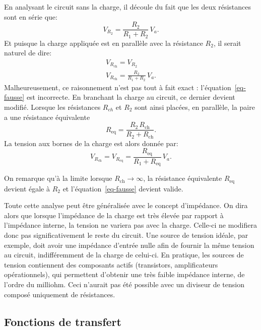 \documentclass[12pt,oneside,letterpaper]{article}
\begin{document}
En analysant le circuit sans la charge, il découle du fait que les deux résistances sont en série que:
\begin{equation}
V_{R_2}=\frac{R_2}{R_1+R_2}\,V_a.
\end{equation}
Et puisque la charge appliquée est en parallèle avec la résistance $R_2$, il serait naturel de dire:
\begin{gather}
V_{R_{\mathrm{ch}}}=V_{R_2}\\
\label{eq-fausse}
V_{R_{\mathrm{ch}}}=\frac{R_2}{R_1+R_2}\,V_a.
\end{gather}
Malheureusement, ce raisonnement n'est pas tout à fait exact : l'équation~\ref{eq-fausse} est incorrecte. En branchant la charge au circuit, ce dernier devient modifié. Lorsque les résistances $R_{ch}$ et $R_2$ sont ainsi placées, en parallèle, la paire a une résistance équivalente
\begin{equation}
R_{\mathrm{eq}}=\frac{R_2\,R_{\mathrm{ch}}}{R_2+R_{\mathrm{ch}}}.
\end{equation}
La tension aux bornes de la charge est alors donnée par:
\begin{equation}
V_{R_{\mathrm{ch}}}=V_{R_{\mathrm{eq}}}=\frac{R_{\mathrm{eq}}}{R_1+R_{\mathrm{eq}}}\,V_a.
\end{equation}

On remarque qu'à la limite lorsque $R_{\mathrm{ch}}\rightarrow\infty$, la résistance équivalente $R_{\mathrm{eq}}$ devient égale à $R_2$ et l'équation~\ref{eq-fausse} devient valide.

Toute cette analyse peut être généralisée avec le concept d'impédance. On dira alors que lorsque l'impédance de la charge est très élevée par rapport à l'impédance interne, la tension ne variera pas avec la charge. Celle-ci ne modifiera donc pas significativement le reste du circuit. Une source de tension idéale, par exemple, doit avoir une impédance d'entrée nulle afin de fournir la même tension au circuit, indifféremment de la charge de celui-ci. En pratique, les sources de tension contiennent des composants actifs (transistors, amplificateurs opérationnels), qui permettent d'obtenir une très faible impédance interne, de l'ordre du milliohm. Ceci n'aurait pas été possible avec un diviseur de tension composé uniquement de résistances.


\subsection{Fonctions de transfert}
\end{document}
